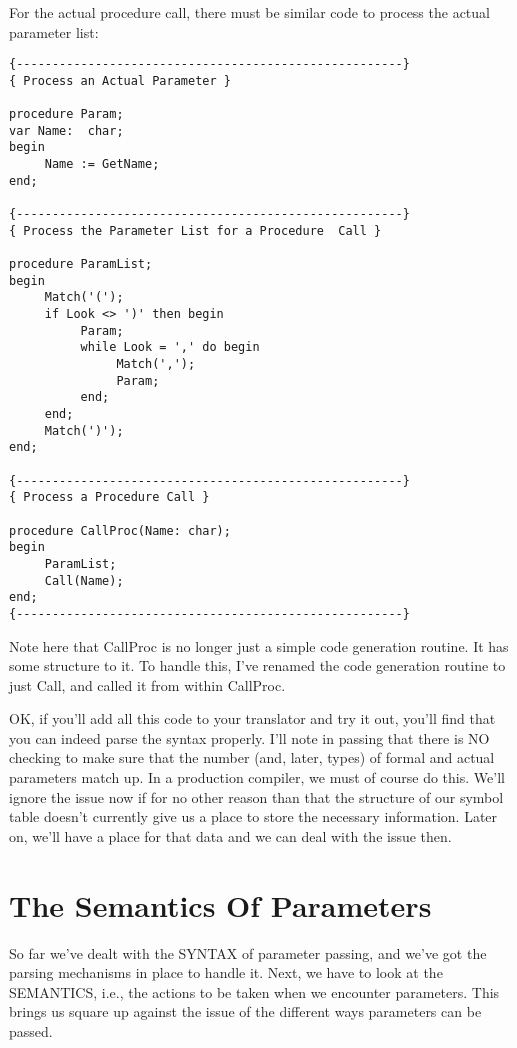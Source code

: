 For  the actual procedure call, there must  be  similar  code  to process the actual parameter list:

\begin{verbatim}
{------------------------------------------------------}
{ Process an Actual Parameter }

procedure Param;
var Name:  char;
begin
     Name := GetName;
end;

{------------------------------------------------------}
{ Process the Parameter List for a Procedure  Call }

procedure ParamList;
begin
     Match('(');
     if Look <> ')' then begin
          Param;
          while Look = ',' do begin
               Match(',');
               Param;
          end;
     end;
     Match(')');
end;

{------------------------------------------------------}
{ Process a Procedure Call }

procedure CallProc(Name: char);
begin
     ParamList;
     Call(Name);
end;
{------------------------------------------------------}
\end{verbatim}

Note  here  that  CallProc  is  no  longer  just  a  simple  code generation  routine. It has some structure to  it. To  handle this, I've renamed the code  generation routine to just Call, and called it from within CallProc.

OK, if you'll add all this code to  your  translator  and  try it out, you'll find that you can indeed parse the syntax properly. I'll note in  passing  that  there  is  NO  checking to make sure that  the  number  (and, later, types)  of  formal  and  actual parameters match up. In a production compiler, we must of course do  this. We'll ignore the issue now if for no other reason than that the structure of our  symbol table doesn't currently give us a place to store the necessary information. Later on, we'll have a place for that data and we can deal with the issue then.

\section{The Semantics Of Parameters}

So  far we've dealt with the SYNTAX  of  parameter  passing, and we've got the parsing mechanisms in place to handle it. Next, we have to look at the SEMANTICS, i.e., the actions to be taken when we encounter parameters. This brings  us  square  up  against the issue of the different ways parameters can be passed.

